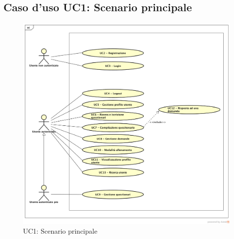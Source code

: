 \subsection{Caso d'uso UC1: Scenario principale}

\label{UC1}
\begin{figure}
	\centering
	\includegraphics[scale=0.5]{UML/UC1.png}
	\caption{UC1: Scenario principale}
\end{figure}


